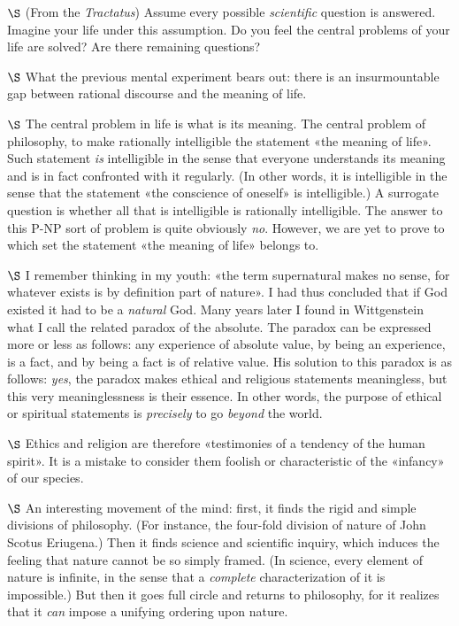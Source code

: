\documentclass[a4paper, 12pt]{article}
\begin{document}
$\S$ (From the \textit{Tractatus}) Assume every possible \textit{scientific}
question is answered. Imagine your life under this assumption. Do you feel the
central problems of your life are solved? Are there remaining questions? 

$\S$ What the previous mental experiment bears out: there is an insurmountable
gap between rational discourse and the meaning of life.

$\S$ The central problem in life is what is its meaning. The central problem of
philosophy, to make rationally intelligible the statement «the meaning of
life». Such statement \textit{is} intelligible in the sense that everyone
understands its meaning and is in fact confronted with it regularly. (In other
words, it is intelligible in the sense that the statement «the conscience of
oneself» is intelligible.) A surrogate question is whether all that is
intelligible is rationally intelligible. The answer to this P-NP sort of problem
is quite obviously \textit{no}. However, we are yet to prove to which set the
statement «the meaning of life» belongs to.

$\S$ I remember thinking in my youth: «the term supernatural makes no sense, for
whatever exists is by definition part of nature». I had thus concluded that if
God existed it had to be a \textit{natural} God. Many years later I found in
Wittgenstein what I call the related paradox of the absolute. The paradox can be
expressed more or less as follows: any experience of absolute value, by being an
experience, is a fact, and by being a fact is of relative value. His solution to
this paradox is as follows: \textit{yes}, the paradox makes ethical and
religious statements meaningless, but this very meaninglessness is their
essence. In other words, the purpose of ethical or spiritual statements is
\textit{precisely} to go \textit{beyond} the world.

$\S$ Ethics and religion are therefore «testimonies of a tendency of the human
spirit». It is a mistake to consider them foolish or characteristic of the
«infancy» of our species. 

$\S$ An interesting movement of the mind: first, it finds the rigid and simple
divisions of philosophy. (For instance, the four-fold division of nature of John
Scotus Eriugena.) Then it finds science and scientific inquiry, which induces
the feeling that nature cannot be so simply framed. (In science, every element
of nature is infinite, in the sense that a \textit{complete} characterization of
it is impossible.) But then it goes full circle and returns to philosophy, for
it realizes that it \textit{can} impose a unifying ordering upon nature.
\end{document}
